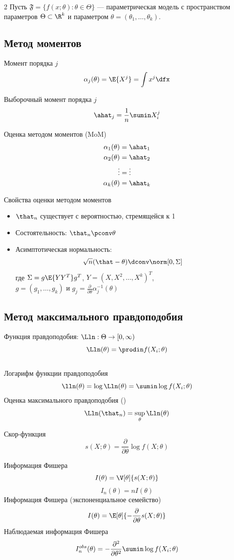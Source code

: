 \documentclass[landscape]{article}
\newenvironment{titemize}[1]{
  \begin{minipage}[h]{\columnwidth}
    #1
    \begin{itemize}
}{
    \end{itemize}
  \end{minipage}
}
\begin{document}
\begin{multicols*}{2}
Пусть $\mathfrak{F} = \bigl\{ f(x;\theta) : \theta\in\Theta \bigr\}$ —
параметрическая модель с пространством параметров $\Theta \subset \R^k$ и параметром
$\theta = (\theta_1,\dots,\theta_k)$.

\subsection{Метод моментов}

Момент порядка $j$
\[\alpha_j(\theta) = \E{X^j} = \displaystyle\int x^j \dfx\]

Выборочный момент порядка $j$
\[\ahat_j = \displaystyle\frac{1}{n}\sumin X_i^j\]

Оценка методом моментов (MoM)
\begin{align*}
  \alpha_1(\theta) &= \ahat_1 \\
  \alpha_2(\theta) &= \ahat_2 \\
  \vdots &= \vdots \\
  \alpha_k(\theta) &= \ahat_k
\end{align*}

\begin{titemize}{Свойства оценки методом моментов}
  \item $\that_n$ существует с вероятностью, стремящейся к 1
  \item Состоятельность: $\that_n \pconv \theta$
  \item Асимптотическая нормальность:
    \[\sqrt{n}(\that-\theta) \dconv \norm[0,\Sigma]\]
    где $\Sigma = g\E{YY^T}g^T$, $Y = (X,X^2,\dots,X^k)^T$,\\
    $g = (g_1,\dots,g_k)$ и
    $g_j = \frac{\partial}{\partial\theta}\alpha_j^{-1}(\theta)$
\end{titemize}

\subsection{Метод максимального правдоподобия}

Функция правдоподобия: $\Lln : \Theta \to [0,\infty)$
  \[\Lln(\theta) = \displaystyle\prodin f(X_i;\theta)\] \\
Логарифм функции правдоподобия
  \[\lln(\theta) = \log \Lln(\theta) = \sumin \log f(X_i;\theta)\]
Оценка максимального правдоподобия (\mle)
\[\Lln(\that_n) = \sup_\theta \Lln(\theta)\]

Скор-функция
\[s(X;\theta) = \frac{\partial}{\partial\theta}\log f(X;\theta)\]

Информация Фишера
\[I(\theta) = \V[\theta]{s(X;\theta)}\]
\[I_n(\theta) = nI(\theta)\]
Информация Фишера (экспоненциальное семейство)
\[I(\theta) = \E[\theta]{-\frac{\partial}{\partial\theta} s(X;\theta)}\]
Наблюдаемая информация Фишера
\[I_n^{obs}(\theta)
  = -\frac{\partial^2}{\partial\theta^2} \sumin\log f(X_i;\theta)\]


\end{multicols*}
\end{document}
